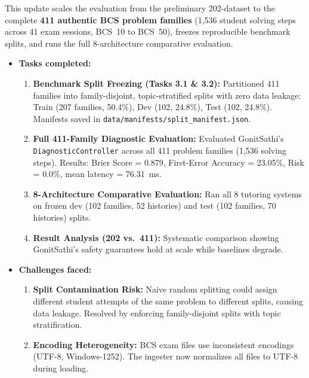 \documentclass[lettersize,onecolumn,journal]{IEEEtran}
\begin{document}
This update scales the evaluation from the preliminary 202-dataset to the complete \textbf{411 authentic BCS problem families} (1,536 student solving steps across 41 exam sessions, BCS~10 to BCS~50), freezes reproducible benchmark splits, and runs the full 8-architecture comparative evaluation.

\begin{itemize}

\item \textbf{Tasks completed:}

\begin{enumerate}
    \item \textbf{Benchmark Split Freezing (Tasks 3.1 \& 3.2):} Partitioned 411 families into family-disjoint, topic-stratified splits with zero data leakage: Train (207 families, 50.4\%), Dev (102, 24.8\%), Test (102, 24.8\%). Manifests saved in \texttt{data/manifests/split\_manifest.json}.

    \item \textbf{Full 411-Family Diagnostic Evaluation:} Evaluated GonitSathi's \texttt{DiagnosticController} across all 411 problem families (1,536 solving steps). Results: Brier Score = 0.879, First-Error Accuracy = 23.05\%, Risk = 0.0\%, mean latency = 76.31~ms.

    \item \textbf{8-Architecture Comparative Evaluation:} Ran all 8 tutoring systems on frozen dev (102 families, 52 histories) and test (102 families, 70 histories) splits.

    \item \textbf{Result Analysis (202 vs.\ 411):} Systematic comparison showing GonitSathi's safety guarantees hold at scale while baselines degrade.
\end{enumerate}

\item \textbf{Challenges faced:}

\begin{enumerate}
    \item \textbf{Split Contamination Risk:} Naive random splitting could assign different student attempts of the same problem to different splits, causing data leakage. Resolved by enforcing family-disjoint splits with topic stratification.
    \item \textbf{Encoding Heterogeneity:} BCS exam files use inconsistent encodings (UTF-8, Windows-1252). The ingester now normalizes all files to UTF-8 during loading.
\end{enumerate}


\end{itemize}
\end{document}
